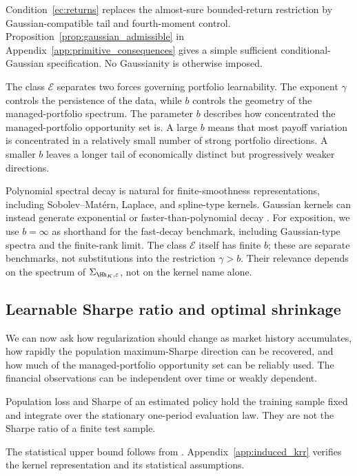 Condition~\ref{ec:returns} replaces the almost-sure bounded-return restriction
by Gaussian-compatible tail and fourth-moment control. Proposition~\ref{prop:gaussian_admissible}
in Appendix~\ref{app:primitive_consequences} gives a simple sufficient
conditional-Gaussian specification. No Gaussianity is otherwise imposed.

The class $\mathcal E$ separates two forces governing portfolio learnability.
The exponent $\gamma$ controls the persistence of the data, while $b$ controls
the geometry of the managed-portfolio spectrum.
The parameter $b$ describes how concentrated the managed-portfolio opportunity
set is. A large $b$ means that most payoff variation is concentrated in a
relatively small number of strong portfolio directions. A smaller $b$ leaves a
longer tail of economically distinct but progressively weaker directions.

Polynomial spectral decay is natural for finite-smoothness representations,
including Sobolev--Mat\'ern, Laplace, and spline-type kernels. Gaussian kernels
can instead generate exponential or faster-than-polynomial decay
\citep{belkin2018}. For exposition, we use $b=\infty$ as shorthand for the
fast-decay benchmark, including Gaussian-type spectra and the finite-rank
limit. The class $\mathcal E$ itself has finite $b$; these are separate
benchmarks, not substitutions into the restriction $\gamma>b$.
Their relevance depends on the spectrum of $\Sigma_{\Hh_K,\varepsilon}$,
not on the kernel name alone.

\subsection{Learnable Sharpe ratio and optimal shrinkage}

We can now ask how regularization should change as market history accumulates,
how rapidly the population maximum-Sharpe direction can be recovered, and how
much of the managed-portfolio opportunity set can be reliably used. The financial observations can be 
independent over time or weakly dependent.

Population loss and Sharpe of an estimated policy hold the training sample
fixed and integrate over the stationary one-period evaluation law. They are
not the Sharpe ratio of a finite test sample.

The statistical upper bound follows from
\citet[Lemma~A.7]{bignozzigagliardinischneider2026}.
Appendix~\ref{app:induced_krr} verifies the kernel representation and its
statistical assumptions.

